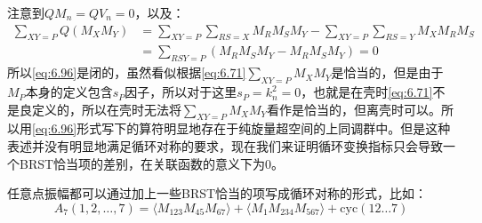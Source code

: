 注意到$QM_n=QV_n=0$，以及：
\begin{equation}
	\begin{aligned}
		\sum_{XY=P}Q(M_XM_Y)&=\sum_{XY=P}\sum_{RS=X}M_RM_SM_Y-\sum_{XY=P}\sum_{RS=Y}M_XM_RM_S\\&=\sum_{RSY=P}\left(M_RM_SM_Y-M_RM_SM_Y\right)=0
	\end{aligned}
\end{equation}
所以\ref{eq:6.96}是闭的，虽然看似根据\ref{eq:6.71}$\sum_{XY=P}M_XM_Y$是恰当的，但是由于$M_P$本身的定义包含$s_P$因子，所以对于这里$s_P=k_n^2=0$，也就是在壳时\ref{eq:6.71}不是良定义的，所以在壳时无法将$\sum_{XY=P}M_XM_Y$看作是恰当的，但离壳时可以。所以用\ref{eq:6.96}形式写下的算符明显地存在于纯旋量超空间的上同调群中。但是这种表述并没有明显地满足循环对称的要求，现在我们来证明循环变换指标只会导致一个BRST恰当项的差别，在关联函数的意义下为$0$。



任意点振幅都可以通过加上一些BRST恰当的项写成循环对称的形式，比如：
\begin{equation}
	A_7(1,2,\ldots,7)=\langle M_{123}M_{45}M_{67}\rangle+\langle M_1M_{234}M_{567}\rangle+\mathrm{cyc}(12\ldots7)
\end{equation}

